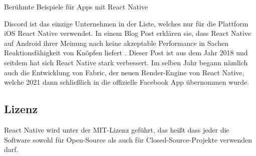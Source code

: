 \begin{center}
  Berühmte Beispiele für Apps mit React Native \cite{reactNativeShowcase}
\end{center}

Discord ist das einzige Unternehmen in der Liste, welches nur für die Plattform iOS React Native
verwendet. In einem Blog Post erklären sie, dass React Native auf Android ihrer Meinung nach keine
akzeptable Performance in Sachen Reaktionsfähigkeit von Knöpfen liefert \cite{reactNativeDiscord}.
Dieser Post ist aus dem Jahr 2018 und seitdem hat sich React Native stark verbessert. Im selben Jahr
begann nämlich auch die Entwicklung von Fabric, der neuen Render-Engine von React Native, welche
2021 dann schließlich in die offizielle Facebook App übernommen wurde.

\subsection{Lizenz}
React Native wird unter der MIT-Lizenz geführt, das heißt dass jeder die Software sowohl für
Open-Source als auch für Closed-Source-Projekte verwenden darf.
